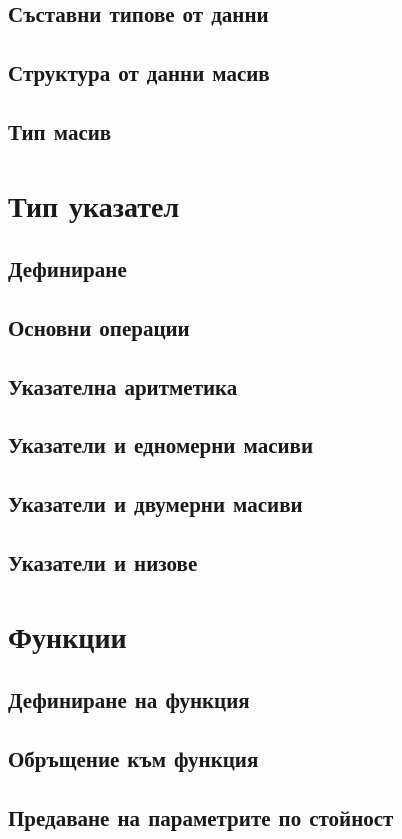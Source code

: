 \documentclass[fleqn,12pt]{article}
\begin{document}
\begin{flushleft}
\subsection{Съставни типове от данни}
\subsection{Структура от данни масив}
\subsection{Тип масив}

\section{Тип указател}
\subsection{Дефиниране}
\subsection{Основни операции}
\subsection{Указателна аритметика}
\subsection{Указатели и едномерни масиви}
\subsection{Указатели и двумерни масиви}
\subsection{Указатели и низове}

\section{Функции}
\subsection{Дефиниране на функция}
\subsection{Обръщение към функция}
\subsection{Предаване на параметрите по стойност}

\end{flushleft}
\end{document}
